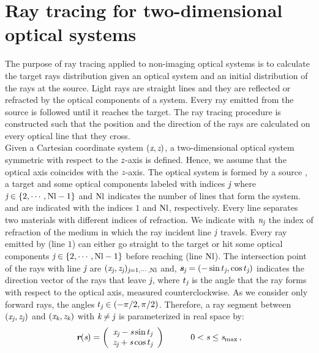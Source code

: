 \section{Ray tracing for two-dimensional optical systems}\label{sec:raytracing}
The purpose of ray tracing applied to non-imaging optical systems is to calculate the target rays distribution given an optical system and an initial distribution of the rays at the source.
Light rays are straight lines and they are reflected or refracted by the optical components of a system.
Every ray emitted from the source is followed until it reaches the target.  
The ray tracing procedure is constructed such that the position and the direction of the rays are calculated on every optical line that they cross. \\ \indent
Given a Cartesian coordinate system $(\textit{x}, \textit{z})$, a two-dimensional optical system symmetric with respect to the $\textit{z}$-axis is defined.
Hence, we assume that the optical axis coincides with the $\textit{z}$-axis.
The optical system is formed by a source , a target   and some optical components labeled with indices $\textit{j}$ where $\textit{j} \in \{2, \cdots, \textrm{Nl}-1\}$ and $\textrm{Nl}$
 indicates the number of lines that form the system.  and  are indicated with the indices $1$ and $\textrm{Nl}$, respectively.
Every line separates two materials with different indices of refraction. We indicate with $\textit{n}_{\textit{j}}$ the index of refraction of the medium in which the ray incident line $\textit{j}$ travels.
Every ray emitted by  (line $1$) can either go straight to the target  or hit some optical components $\textit{j}\in\{2, \cdots, \textrm{Nl} -1\}$ before reaching  (line $\textrm{Nl}$).
The intersection point of the rays with line $\textit{j}$ are $(\textit{x}_{\textit{j}}, \textit{z}_{\textit{j}})_{\textit{j} =1, \cdots, \textrm{Nl}}$ and, $\textit{\textbf{s}}_{\textit{j}}= (-\sin t_{\textit{j}}, \cos t_{\textit{j}})$ indicates the direction vector of the rays that leave $\textit{j}$,
where $t_{\textit{j}}$ is the angle that the ray forms with respect to the optical axis, measured counterclockwise. As we consider only forward rays, the angles
$t_{\textit{j}}\in (-\pi/2, \pi/2)$.
Therefore, a ray segment between $(\textit{x}_{\textit{j}}, \textit{z}_{\textit{j}})$ and $(\textit{x}_{\textit{k}}, \textit{z}_{\textit{k}})$
with $\textit{k}\neq\textit{j}$ is parameterized in real space by:
\begin{equation}
\label{parametrization}
\textit{\textbf{r}}(\textit{s})=
\left( \begin{array}{cc}
\textit{x}_{\textit{j}}-\textit{s}\sin t_{\textit{j}} \\
\textit{z}_{\textit{j}}+\textit{s}\cos t_{\textit{j}}\end{array} \right) \qquad \quad 0< \textit{s}\leq \textit{s}_{\textrm{max}}\,,
\end{equation}
